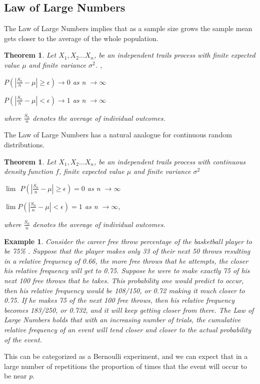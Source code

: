 \documentclass[11pt,a4paper]{article}
\theoremstyle{plain}
\newtheorem{thm}[fact]{Theorem}
\newtheorem{exmp}[fact]{Example}
\begin{document}
\subsection{\bf Law of Large Numbers}
The Law of Large Numbers implies that as a sample size grows the sample mean gets closer to the average of the whole population.
\begin{thm}
Let $X_1, X_2...X_n$, be an independent trails process with finite expected value $\mu$ and finite variance $\sigma^2$.
,
\begin{center}
$P(|\frac{S_n}{n}-\mu|\geq\epsilon)\rightarrow 0$ as n $\rightarrow\infty$
\end{center}
\begin{center}
$P(|\frac{S_n}{n}-\mu|<\epsilon)\rightarrow 1$ as n $\rightarrow\infty$
\end{center}
where $\frac{S_n}{n}$ denotes the average of individual outcomes.
\end{thm}
The Law of Large Numbers has a natural analogue for continuous random distributions.
\begin{thm}
Let $X_1, X_2...X_n$, be an independent trails process with continuous density function $f$, finite expected value $\mu$ and finite variance $\sigma^2$ 
\begin{center}
$\lim$ $P(|\frac{S_n}{n}-\mu|\geq\epsilon)= 0$ as n $\rightarrow\infty$ 
\end{center}
\begin{center}
$\lim$$P(|\frac{S_n}{n}-\mu|<\epsilon)= 1$ as n $\rightarrow\infty$,
\end{center}
where $\frac{S_n}{n}$ denotes the average of individual outcomes. 
\end{thm}




\begin{exmp}
 Consider the career free throw percentage of the basketball player to be 75\% . Suppose that the player makes only 33 of their next 50 throws resulting in a relative frequency of 0.66, the more free throws that he attempts, the closer his relative frequency will get to 0.75. Suppose he were to make exactly 75 of his next 100 free throws that he takes. This probability one would predict to occur, then his relative frequency would be 108/150, or 0.72 making it much closer to 0.75. If he makes 75 of the next 100 free throws, then his relative frequency becomes 183/250, or 0.732, and it will keep getting closer from there. The Law of Large Numbers holds that with an increasing number of trials, the cumulative relative frequency of an event will tend closer and closer to the actual probability of the event.
\end{exmp}
This can be categorized as a Bernoulli experiment, and we can expect that in a large number of repetitions the proportion of times that the event will occur to be near $p$.
\end{document}
